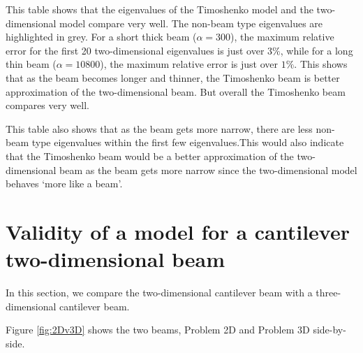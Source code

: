 	This table shows that the eigenvalues of the Timoshenko model and the two-dimensional model compare very well. The non-beam type eigenvalues are highlighted in grey. For a short thick beam ($\alpha = 300$), the maximum relative error for the first 20 two-dimensional eigenvalues is just over $3\%$, while for a long thin beam ($\alpha = 10800$), the maximum relative error is just over $1\%$. This shows that as the beam becomes longer and thinner, the Timoshenko beam is better approximation of the two-dimensional beam. But overall the Timoshenko beam compares very well.

	This table also shows that as the beam gets more narrow, there are less non-beam type eigenvalues within the first few eigenvalues.This would also indicate that the Timoshenko beam would be a better approximation of the two-dimensional beam as the beam gets more narrow since the two-dimensional model behaves `more like a beam'.



\section{Validity of a model for a cantilever two-dimensional beam} \label{sec:validity-of-a-2d-beam}
In this section, we compare the two-dimensional cantilever beam with a three-dimensional cantilever beam.

Figure \ref{fig:2Dv3D} shows the two beams, Problem 2D and Problem 3D side-by-side.

